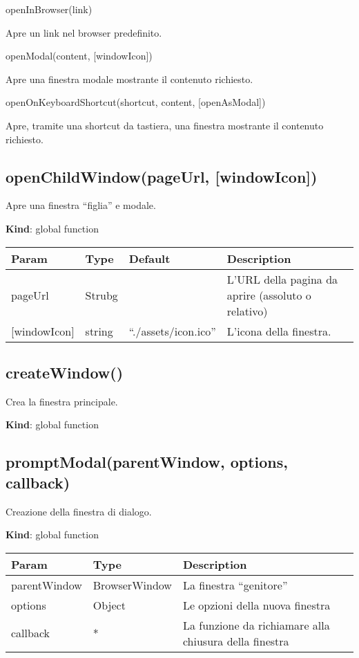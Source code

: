 openInBrowser(link)

Apre un link nel browser predefinito.

openModal(content, {[}windowIcon{]})

Apre una finestra modale mostrante il contenuto richiesto.

openOnKeyboardShortcut(shortcut, content, {[}openAsModal{]})

Apre, tramite una shortcut da tastiera, una finestra mostrante il
contenuto richiesto.

\hypertarget{openchildwindowpageurl-windowicon-1}{%
\subsection{openChildWindow(pageUrl,
{[}windowIcon{]})}\label{openchildwindowpageurl-windowicon-1}}

Apre una finestra ``figlia'' e modale.

\textbf{Kind}: global function

\begin{longtable}[]{@{}llll@{}}
\toprule
Param & Type & Default & Description\tabularnewline
\midrule
\endhead
pageUrl & Strubg & & L'URL della pagina da aprire (assoluto o
relativo)\tabularnewline
{[}windowIcon{]} & string & ``./assets/icon.ico'' & L'icona della
finestra.\tabularnewline
\bottomrule
\end{longtable}

\hypertarget{createwindow-1}{%
\subsection{createWindow()}\label{createwindow-1}}

Crea la finestra principale.

\textbf{Kind}: global function\\

\hypertarget{promptmodalparentwindow-options-callback-1}{%
\subsection{promptModal(parentWindow, options,
callback)}\label{promptmodalparentwindow-options-callback-1}}

Creazione della finestra di dialogo.

\textbf{Kind}: global function

\begin{longtable}[]{@{}lll@{}}
\toprule
Param & Type & Description\tabularnewline
\midrule
\endhead
parentWindow & BrowserWindow & La finestra ``genitore''\tabularnewline
options & Object & Le opzioni della nuova finestra\tabularnewline
callback & * & La funzione da richiamare alla chiusura della
finestra\tabularnewline
\bottomrule
\end{longtable}

